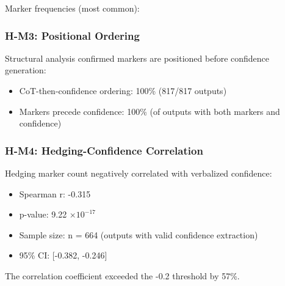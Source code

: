 Marker frequencies (most common):

\begin{table}[htbp]
\centering
{}
\end{table}

\subsubsection{H-M3: Positional Ordering}

Structural analysis confirmed markers are positioned before confidence generation:

\begin{itemize}
\item CoT-then-confidence ordering: 100\% (817/817 outputs)
\item Markers precede confidence: 100\% (of outputs with both markers and confidence)
\end{itemize}

\subsubsection{H-M4: Hedging-Confidence Correlation}

Hedging marker count negatively correlated with verbalized confidence:

\begin{itemize}
\item Spearman r: -0.315
\item p-value: 9.22 $\times 10^{-17}$
\item Sample size: n = 664 (outputs with valid confidence extraction)
\item 95\% CI: [-0.382, -0.246]
\end{itemize}

The correlation coefficient exceeded the -0.2 threshold by 57\%.


